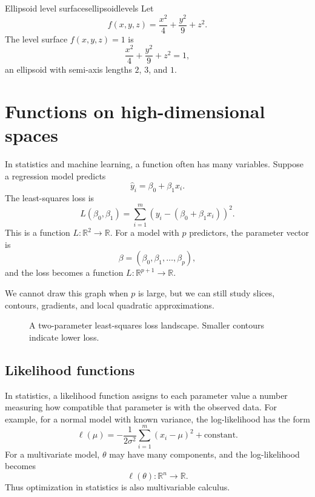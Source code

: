 \documentclass[11pt]{article}
\newcommand{\R}{\mathbb R}
\begin{document}
\begin{workedexample}{Ellipsoid level surfaces}{ellipsoidlevels}
Let
\[
f(x,y,z)=\frac{x^2}{4}+\frac{y^2}{9}+z^2.
\]
The level surface $f(x,y,z)=1$ is
\[
\frac{x^2}{4}+\frac{y^2}{9}+z^2=1,
\]
an ellipsoid with semi-axis lengths $2$, $3$, and $1$.
\end{workedexample}

\section{Functions on high-dimensional spaces}

In statistics and machine learning, a function often has many variables. Suppose a regression model predicts
\[
\widehat y_i=\beta_0+\beta_1x_i.
\]
The least-squares loss is
\[
L(\beta_0,\beta_1)=\sum_{i=1}^m \left(y_i-(\beta_0+\beta_1x_i)\right)^2.
\]
This is a function $L:\R^2\to\R$. For a model with $p$ predictors, the parameter vector is
\[
\beta=(\beta_0,\beta_1,\ldots,\beta_p),
\]
and the loss becomes a function $L:\R^{p+1}\to\R$.

We cannot draw this graph when $p$ is large, but we can still study slices, contours, gradients, and local quadratic approximations.

\begin{figure}[H]
\centering
{}
\caption{A two-parameter least-squares loss landscape. Smaller contours indicate lower loss.}
\end{figure}

\subsection*{Likelihood functions}
In statistics, a likelihood function assigns to each parameter value a number measuring how compatible that parameter is with the observed data. For example, for a normal model with known variance, the log-likelihood has the form
\[
\ell(\mu)=-\frac{1}{2\sigma^2}\sum_{i=1}^m (x_i-\mu)^2+\text{constant}.
\]
For a multivariate model, $\theta$ may have many components, and the log-likelihood becomes
\[
\ell(\theta):\R^n\to\R.
\]
Thus optimization in statistics is also multivariable calculus.
\end{document}
